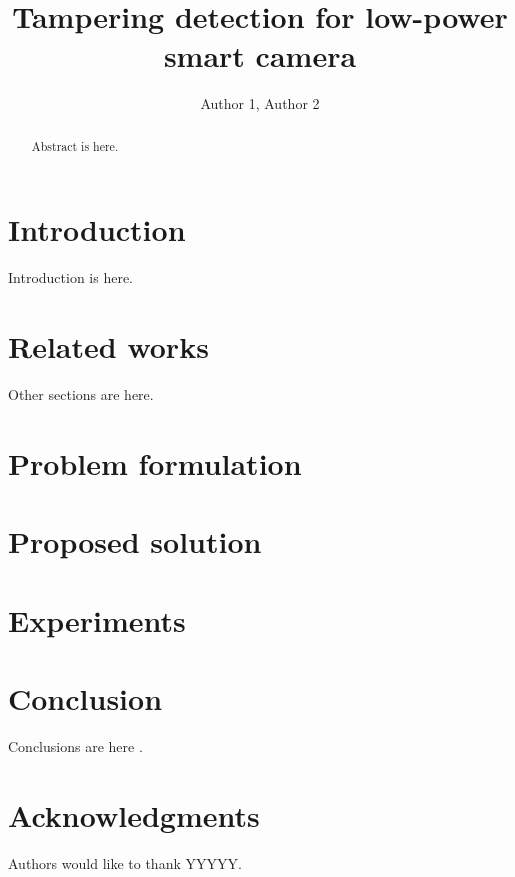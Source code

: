 \documentclass{llncs}
\begin{document}
\title{Tampering detection for low-power smart camera}

\author{Author 1, Author 2}

\maketitle

\begin{abstract}
	
	Abstract is here.
	
\end{abstract}

\section{Introduction}\label{sec:introduction}

Introduction is here.

\section{Related works}\label{sec:relWorks}

Other sections are here. 

\section{Problem formulation}\label{sec:probForm}

\section{Proposed solution}\label{sec:propSol}

\section{Experiments}\label{sec:experiments}

\section{Conclusion}\label{sec:Conclusion}

Conclusions are here \cite{aksay2007camera}.

\section*{Acknowledgments}\label{sec:Acknowledgments}

Authors would like to thank YYYYY.




%	
%	
\end{document}
